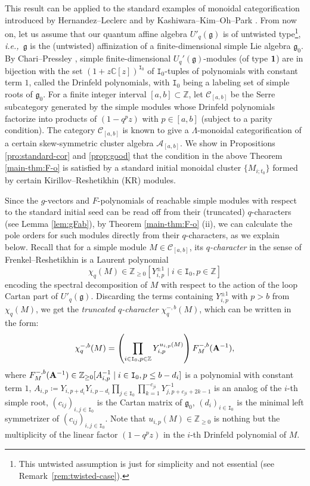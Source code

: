 \documentclass[12pt]{amsart}
\theoremstyle{definition}
\theoremstyle{remark}
\numberwithin{equation}{section}
\newcommand{\ie}{\textit{i.e.,}\ }
\begin{document}
This result can be applied to the standard examples of monoidal categorification introduced by Hernandez--Leclerc \cite{HL16} and by Kashiwara--Kim--Oh--Park \cite{kkop-2024}.
From now on, let us assume that our quantum affine algebra $U'_q(\mathfrak{g})$ is of untwisted type\footnote{This untwisted assumption is just for simplicity and not essential (see Remark~\ref{rem:twisted-case}).}, \ie $\mathfrak{g}$ is the (untwisted) affinization of a finite-dimensional simple Lie algebra $\mathfrak{g}_0$.
By Chari--Pressley \cite[Chapter 12]{CP-1994}, simple finite-dimensional $U_q'(\mathfrak{g})$-modules (of type ${\bf 1}$) are in bijection with the set $(1+z\mathbb{C}[z])^{\mathtt I_0}$ of $\mathtt I_0$-tuples of polynomials with constant term $1$, called the Drinfeld polynomials, with $\mathtt I_0$ being a labeling set of simple roots of $\mathfrak{g}_0$.
For a finite integer interval $[a,b] \subset \mathbb{Z}$, let $\mathcal{C}_{[a,b]}$ be the Serre subcategory generated by  the simple modules whose Drinfeld polynomials factorize into products of $(1-q^pz)$ with $p \in [a,b]$ (subject to a parity condition).
The category $\mathcal{C}_{[a,b]}$ is known to give a $\mathsf{\Lambda}$-monoidal categorification of a certain skew-symmetric cluster algebra $\mathcal{A}_{[a,b]}$. We show in Propositions \ref{pro:standard-cor} and \ref{prop:good} that the condition in the above Theorem \ref{main-thm:F-o} is satisfied by a standard initial monoidal cluster $\{M_{i;t_0}\}$ formed by certain Kirillov--Reshetikhin (KR) modules.  


Since the $g$-vectors and $F$-polynomials of reachable simple modules with respect to the standard initial seed can be read off from their (truncated) $q$-characters (see Lemma \ref{lem:gFab}), by Theorem \ref{main-thm:F-o} (ii), we can calculate the pole orders for such modules directly from their $q$-characters, as we explain below. Recall that for a simple module $M \in \mathcal{C}_{[a,b]}$, its {\em $q$-character} in the sense of Frenkel--Reshetikhin \cite{FR99} is a Laurent polynomial $$\chi_q(M) \in \mathbb{Z}_{\ge 0}[Y_{i,p}^{\pm 1} \mid i \in \mathtt I_0, p \in \mathbb{Z}]$$ encoding the spectral decomposition of $M$ with respect to the action of the loop Cartan part of $U'_q(\mathfrak{g})$. 
Discarding the terms containing $Y_{i,p}^{\pm 1}$ with $p > b$ from $\chi_q(M)$, we get the {\em truncated $q$-character} $\chi^{-, b}_q(M)$, which can be written in the form:
\[ \chi^{-, b}_q(M) = \left( \prod_{i \in \mathtt I_0, p \in \mathbb{Z}}Y_{i,p}^{u_{i,p}(M)} \right) F_M^{-, b}({\bf A}^{-1}),\]
where $F_M^{-, b}({\bf A}^{-1}) \in \mathbb{Z}_{\ge 0}[A_{i,p}^{-1} \mid i \in \mathtt I_0, p \le b-d_i]$ is a polynomial with constant term $1$, $A_{i,p} \coloneqq Y_{i,p+d_i}Y_{i,p-d_i}\prod_{j \in \mathtt I_0}\prod_{k=1}^{-c_{ji}}Y^{-1}_{j,p+c_{ji}+2k-1}$ is an analog of the $i$-th simple root, $(c_{ij})_{i,j \in \mathtt I_0}$ is the Cartan matrix of $\mathfrak{g}_0$, $(d_i)_{i \in \mathtt I_0}$ is the minimal left symmetrizer of $(c_{ij})_{i,j \in \mathtt I_0}$. 
Note that $u_{i,p}(M) \in \mathbb{Z}_{\ge 0}$ is nothing but the multiplicity of the linear factor $(1-q^pz)$ in the $i$-th Drinfeld polynomial of $M$.
\end{document}
